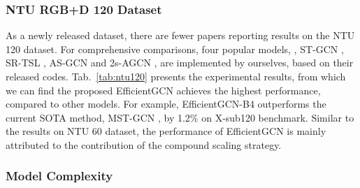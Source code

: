 \documentclass[10pt,journal,compsoc]{IEEEtran}
\begin{document}
\subsubsection{NTU RGB+D 120 Dataset}
\label{sssec:ntu120}

As a newly released dataset, there are fewer papers reporting results on the NTU 120 dataset. For comprehensive comparisons, four popular models, \ie, ST-GCN \cite{yan2018spatial}, SR-TSL \cite{si2018skeleton}, AS-GCN \cite{li2019actional} and 2s-AGCN \cite{shi2019two}, are implemented by ourselves, based on their released codes. Tab.~\ref{tab:ntu120} presents the experimental results, from which we can find the proposed EfficientGCN achieves the highest performance, compared to other models. For example, EfficientGCN-B4 outperforms the current SOTA method, MST-GCN \cite{ye2020dynamic}, by 1.2\% on X-sub120 benchmark. Similar to the results on NTU 60 dataset, the performance of EfficientGCN is mainly attributed to the contribution of the compound scaling strategy.

\subsubsection{Model Complexity}
\label{sssec:complexity}
\end{document}
